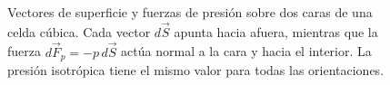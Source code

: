 {\begin{figure}[htbp]
    \caption{Vectores de superficie y fuerzas de presión sobre dos caras de
    una celda cúbica. Cada vector $d\vec{S}$ apunta hacia afuera, mientras que
    la fuerza $d\vec{F}_p=-p\,d\vec{S}$ actúa normal a la cara y hacia el
    interior. La presión isotrópica tiene el mismo valor para todas las
    orientaciones.}
    \label{fig:celda-presion}
\end{figure}%
}